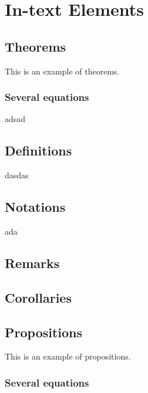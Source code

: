 
\chapter{In-text Elements}
%
\section{Theorems}
{{{
This is an example of theorems.
}}}
\subsection{Several equations}

adsad

\section{Definitions}

dasdas

\section{Notations}
ada


\section{Remarks}



\section{Corollaries}


\section{Propositions}

This is an example of propositions.

\subsection{Several equations}

